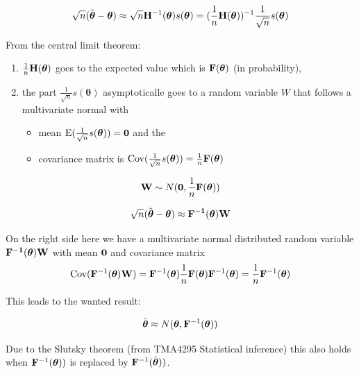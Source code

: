 \documentclass[
  ignorenonframetext,
]{beamer}
\providecommand{\tightlist}{%
  \setlength{\itemsep}{0pt}\setlength{\parskip}{0pt}}
\begin{document}
\begin{frame}
\[ \sqrt{n}(\hat{\boldsymbol{\theta}}-{\boldsymbol{\theta}})\approx \sqrt{n}{\bf H}^{-1}({\boldsymbol{\theta}})s({\boldsymbol{\theta}})=(\frac{1}{n}{\bf H}({\boldsymbol{\theta}}))^{-1}\frac{1}{\sqrt{n}}s({\boldsymbol{\theta}})\]

From the central limit theorem:

\begin{enumerate}
[1)]
\item
  \(\frac{1}{n}{\bf H}(\boldsymbol{\theta})\) goes to the expected value
  which is \({\bf F}(\boldsymbol{\theta})\) (in probability),
\item
  the part \(\frac{1}{\sqrt{n}}s({\boldsymbol{\theta}})\) asymptoticalle
  goes to a random variable \(W\) that follows a multivariate normal
  with

  \begin{itemize}
  \tightlist
  \item
    mean
    \(\text{E}(\frac{1}{\sqrt{n}}s({\boldsymbol{\theta}}))={\bf 0}\) and
    the
  \item
    covariance matrix is
    \(\text{Cov}(\frac{1}{\sqrt{n}}s({\boldsymbol{\theta}}))=\frac{1}{n}{\bf F}(\boldsymbol{\theta})\)
  \end{itemize}
\end{enumerate}

\[ {\bf W} \sim N({\bf 0},\frac{1}{n}{\bf F}(\boldsymbol{\theta}))\]
\end{frame}

\begin{frame}
\[\sqrt{n}(\hat{\boldsymbol{\theta}}-{\boldsymbol{\theta}}) \approx \bf{F}^{-1}(\boldsymbol{\theta}){\bf W}\]

On the right side here we have a multivariate normal distributed random
variable \(\bf{F}^{-1}(\boldsymbol{\theta}){\bf W}\) with mean
\({\bf 0}\) and covariance matrix
\[\text{Cov}({\bf F}^{-1}(\boldsymbol{\theta}){\bf W})={\bf F}^{-1}(\boldsymbol{\theta})\frac{1}{n}{\bf F}(\boldsymbol{\theta}){\bf F}^{-1}(\boldsymbol{\theta})=\frac{1}{n}{\bf F}^{-1}(\boldsymbol{\theta})\]

This leads to the wanted result:

\[ \hat{\boldsymbol{\theta}}\approx N(\boldsymbol{\theta},{\bf F}^{-1}(\boldsymbol{\theta}))\]

Due to the Slutsky theorem (from TMA4295 Statistical inference) this
also holds when \({\bf F}^{-1}(\boldsymbol{\theta}))\) is replaced by
\({\bf F}^{-1}(\hat{\boldsymbol{\theta}}))\).
\end{frame}
\end{document}
